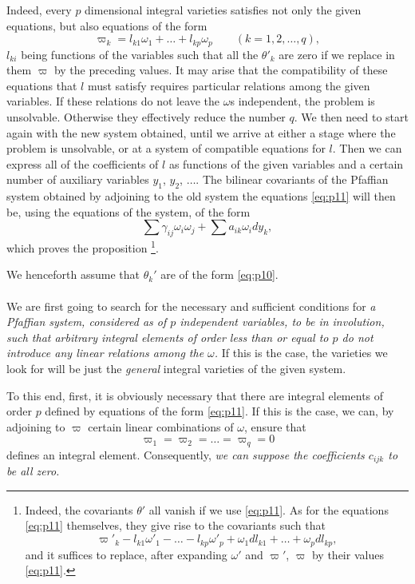 \documentclass[leqno,11pt]{book}
\theoremstyle{shape1}
\theoremstyle{shapesmall}
\newcommand{\vp}{\varpi}
\begin{document}
Indeed, every $p$ dimensional integral varieties satisfies not only the given equations, but also equations of the form
\begin{equation}
  \label{eq:p11}
  \vp_{k}=l_{k1}\omega_{1}+\dots+l_{kp}\omega_{p}\qquad(k=1,2,\dots,q),
\end{equation}
$l_{ki}$ being functions of the variables such that all the $\theta'_{k}$ are zero if we replace in them $\vp$ by the preceding values. It may arise that the compatibility of these equations that $l$ must satisfy requires particular relations among the given variables. If these relations do not leave the $\omega$s independent, the problem is unsolvable. Otherwise they effectively reduce the number $q$. We then need to start again with the new system obtained, until we arrive at either a stage where the problem is unsolvable, or at a system of compatible equations for $l$. Then we can express all of the coefficients of $l$ as functions of the given variables and a certain number of auxiliary variables $y_{1}$, $y_{2}$, $\dots$. The bilinear covariants of the Pfaffian system obtained by adjoining to the old system the equations \eqref{eq:p11} will then be, using the equations of the system, of the form
\[
\sum\gamma_{ij}\omega_{i}\omega_{j}+\sum a_{ik}\omega_{i}dy_{k},
\]
which proves the proposition \footnote{Indeed, the covariants $\theta'$ all vanish if we use \eqref{eq:p11}. As for the equations \eqref{eq:p11} themselves, they give rise to the covariants such that
\[
\vp'_{k}-l_{k1}\omega'_{1}-\dots-l_{kp}\omega'_{p}+\omega_{1}dl_{k1}+\dots+\omega_{p}dl_{kp},
\]
and it suffices to replace, after expanding $\omega'$ and $\vp'$, $\vp$ by their values \eqref{eq:p11}.
}.

We henceforth assume that $\theta_{k}'$ are of the form \eqref{eq:p10}.

\paragraph{}
\label{sec:p5}
We are first going to search for the necessary and sufficient conditions for \emph{a Pfaffian system, considered as of $p$ independent variables, to be in involution, such that arbitrary integral elements of order less than or equal to $p$ do not introduce any linear relations among the $\omega$.} If this is the case, the varieties we look for will be just the \emph{general} integral varieties of the given system.

To this end, first, it is obviously necessary that there are integral elements of order $p$ defined by equations of the form \eqref{eq:p11}. If this is the case, we can, by adjoining to $\vp$ certain linear combinations of $\omega$, ensure that
\[
\vp_{1}=\vp_{2}=\dots=\vp_{q}=0
\]
defines an integral element. Consequently, \emph{we can suppose the coefficients $c_{ijk}$ to be all zero.}
\end{document}
